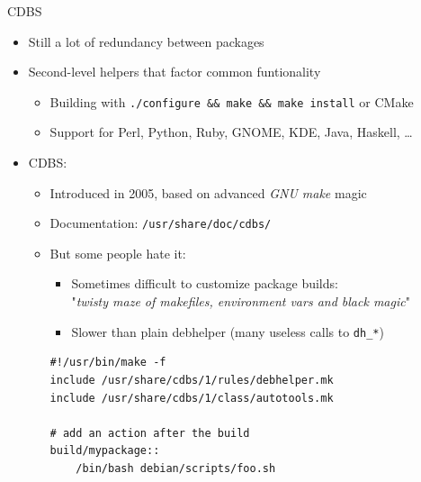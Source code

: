 \documentclass[10pt,final]{beamer}
\begin{document}
\begin{frame}[fragile]{CDBS}
  \hbr
  \begin{itemize}
  \item Still a lot of redundancy between packages
    \hbr
  \item Second-level helpers that factor common funtionality
    \begin{itemize}
    \item Building with \texttt{./configure \&\& make \&\& make install} or CMake
    \item Support for Perl, Python, Ruby, GNOME, KDE, Java, Haskell, \ldots
    \end{itemize}
    \hbr
  \item CDBS:
    \begin{itemize}
    \item Introduced in 2005, based on advanced \textsl{GNU make} magic
    \item Documentation: \texttt{/usr/share/doc/cdbs/}
    \item But some people hate it:
      \begin{itemize}
      \item Sometimes difficult to customize package builds:\\
        "\textsl{twisty maze of makefiles, environment vars and black magic}"
      \item Slower than plain debhelper (many useless calls to \texttt{dh\_*})
      \end{itemize}
      \begin{lstlisting}[basicstyle=\ttfamily\footnotesize]
#!/usr/bin/make -f
include /usr/share/cdbs/1/rules/debhelper.mk
include /usr/share/cdbs/1/class/autotools.mk

# add an action after the build
build/mypackage::
    /bin/bash debian/scripts/foo.sh
      \end{lstlisting}
    \end{itemize}
  \end{itemize}
\end{frame}
\end{document}
